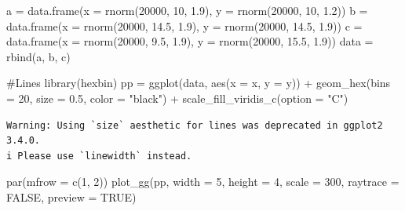 \documentclass[
  letterpaper,
]{scrbook}
\newenvironment{Shaded}{\begin{snugshade}}{\end{snugshade}}
\newcommand{\AttributeTok}[1]{\textcolor[rgb]{0.40,0.45,0.13}{#1}}
\newcommand{\CommentTok}[1]{\textcolor[rgb]{0.37,0.37,0.37}{#1}}
\newcommand{\ConstantTok}[1]{\textcolor[rgb]{0.56,0.35,0.01}{#1}}
\newcommand{\DecValTok}[1]{\textcolor[rgb]{0.68,0.00,0.00}{#1}}
\newcommand{\FloatTok}[1]{\textcolor[rgb]{0.68,0.00,0.00}{#1}}
\newcommand{\FunctionTok}[1]{\textcolor[rgb]{0.28,0.35,0.67}{#1}}
\newcommand{\NormalTok}[1]{\textcolor[rgb]{0.00,0.23,0.31}{#1}}
\newcommand{\OtherTok}[1]{\textcolor[rgb]{0.00,0.23,0.31}{#1}}
\newcommand{\SpecialCharTok}[1]{\textcolor[rgb]{0.37,0.37,0.37}{#1}}
\newcommand{\StringTok}[1]{\textcolor[rgb]{0.13,0.47,0.30}{#1}}
\begin{document}
\begin{Shaded}
\begin{Highlighting}[]
\NormalTok{a }\OtherTok{=} \FunctionTok{data.frame}\NormalTok{(}\AttributeTok{x =} \FunctionTok{rnorm}\NormalTok{(}\DecValTok{20000}\NormalTok{, }\DecValTok{10}\NormalTok{, }\FloatTok{1.9}\NormalTok{), }\AttributeTok{y =} \FunctionTok{rnorm}\NormalTok{(}\DecValTok{20000}\NormalTok{, }\DecValTok{10}\NormalTok{, }\FloatTok{1.2}\NormalTok{))}
\NormalTok{b }\OtherTok{=} \FunctionTok{data.frame}\NormalTok{(}\AttributeTok{x =} \FunctionTok{rnorm}\NormalTok{(}\DecValTok{20000}\NormalTok{, }\FloatTok{14.5}\NormalTok{, }\FloatTok{1.9}\NormalTok{), }\AttributeTok{y =} \FunctionTok{rnorm}\NormalTok{(}\DecValTok{20000}\NormalTok{, }\FloatTok{14.5}\NormalTok{, }\FloatTok{1.9}\NormalTok{))}
\NormalTok{c }\OtherTok{=} \FunctionTok{data.frame}\NormalTok{(}\AttributeTok{x =} \FunctionTok{rnorm}\NormalTok{(}\DecValTok{20000}\NormalTok{, }\FloatTok{9.5}\NormalTok{, }\FloatTok{1.9}\NormalTok{), }\AttributeTok{y =} \FunctionTok{rnorm}\NormalTok{(}\DecValTok{20000}\NormalTok{, }\FloatTok{15.5}\NormalTok{, }\FloatTok{1.9}\NormalTok{))}
\NormalTok{data }\OtherTok{=} \FunctionTok{rbind}\NormalTok{(a, b, c)}

\CommentTok{\#Lines}
\FunctionTok{library}\NormalTok{(hexbin)}
\NormalTok{pp }\OtherTok{=} \FunctionTok{ggplot}\NormalTok{(data, }\FunctionTok{aes}\NormalTok{(}\AttributeTok{x =}\NormalTok{ x, }\AttributeTok{y =}\NormalTok{ y)) }\SpecialCharTok{+}
  \FunctionTok{geom\_hex}\NormalTok{(}\AttributeTok{bins =} \DecValTok{20}\NormalTok{, }\AttributeTok{size =} \FloatTok{0.5}\NormalTok{, }\AttributeTok{color =} \StringTok{"black"}\NormalTok{) }\SpecialCharTok{+}
  \FunctionTok{scale\_fill\_viridis\_c}\NormalTok{(}\AttributeTok{option =} \StringTok{"C"}\NormalTok{)}
\end{Highlighting}
\end{Shaded}

\begin{verbatim}
Warning: Using `size` aesthetic for lines was deprecated in ggplot2 3.4.0.
i Please use `linewidth` instead.
\end{verbatim}

\begin{Shaded}
\begin{Highlighting}[]
\FunctionTok{par}\NormalTok{(}\AttributeTok{mfrow =} \FunctionTok{c}\NormalTok{(}\DecValTok{1}\NormalTok{, }\DecValTok{2}\NormalTok{))}
\FunctionTok{plot\_gg}\NormalTok{(pp, }\AttributeTok{width =} \DecValTok{5}\NormalTok{, }\AttributeTok{height =} \DecValTok{4}\NormalTok{, }\AttributeTok{scale =} \DecValTok{300}\NormalTok{, }\AttributeTok{raytrace =} \ConstantTok{FALSE}\NormalTok{, }\AttributeTok{preview =} \ConstantTok{TRUE}\NormalTok{)}
\end{Highlighting}
\end{Shaded}
\end{document}

